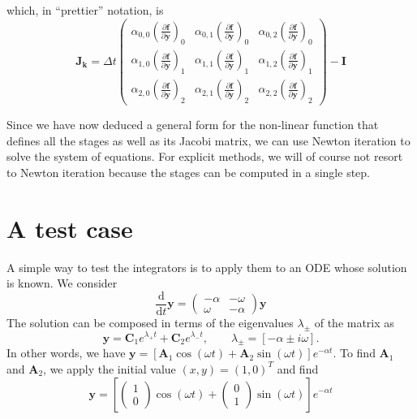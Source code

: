 \documentclass[10pt,a4paper]{article}
\newcommand{\bvec}[1]{\mathbf{#1}}
\newcommand{\dd}[0]{ \mathrm{d} }
\begin{document}
which, in ``prettier'' notation, is
\begin{equation*}
  \bvec{J}_\bvec{k} = \Delta t \begin{pmatrix}
    \alpha_{0,0}\left( \frac{\partial \bvec{f}}{\partial \bvec{y}} \right)_0 & \alpha_{0,1}\left( \frac{\partial \bvec{f}}{\partial \bvec{y}} \right)_0 & \alpha_{0,2}\left( \frac{\partial \bvec{f}}{\partial \bvec{y}} \right)_0 \\
    \alpha_{1,0}\left( \frac{\partial \bvec{f}}{\partial \bvec{y}} \right)_1 & \alpha_{1,1}\left( \frac{\partial \bvec{f}}{\partial \bvec{y}} \right)_1 & \alpha_{1,2}\left( \frac{\partial \bvec{f}}{\partial \bvec{y}} \right)_1 \\
    \alpha_{2,0}\left( \frac{\partial \bvec{f}}{\partial \bvec{y}} \right)_2 & \alpha_{2,1}\left( \frac{\partial \bvec{f}}{\partial \bvec{y}} \right)_2 & \alpha_{2,2}\left( \frac{\partial \bvec{f}}{\partial \bvec{y}} \right)_2
  \end{pmatrix} - \bvec{I}
\end{equation*}

Since we have now deduced a general form for the non-linear function that defines all the stages as well as its Jacobi matrix, we can use Newton iteration to solve the system of equations.
For explicit methods, we will of course not resort to Newton iteration because the stages can be computed in a single step.

\section{A test case}
A simple way to test the integrators is to apply them to an ODE whose solution is known.
We consider
\begin{equation*}
  \frac{\dd}{\dd t} \bvec{y} = \begin{pmatrix}
    -\alpha & -\omega \\
    \omega & -\alpha \end{pmatrix} \bvec{y}
\end{equation*}
The solution can be composed in terms of the eigenvalues $\lambda_\pm$ of the matrix as
\begin{equation*}
  \bvec{y} = \bvec{C}_1e^{\lambda_+t} + \bvec{C}_2e^{\lambda_-t}, \qquad \lambda_\pm = \left[-\alpha \pm i \omega\right].
\end{equation*}
In other words, we have $\bvec{y} = \left[ \bvec{A}_1\cos(\omega t) + \bvec{A}_2 \sin(\omega t) \right]e^{-\alpha t}.$
To find $\bvec{A}_1$ and $\bvec{A}_2$, we apply the initial value $(x,y) = (1,0)^T$ and find
\begin{equation*}
  \bvec{y} = \left[ \begin{pmatrix} 1 \\ 0 \end{pmatrix} \cos(\omega t) +
  \begin{pmatrix} 0 \\ 1 \end{pmatrix} \sin( \omega t ) \right]e^{-\alpha t}
\end{equation*}
\end{document}
